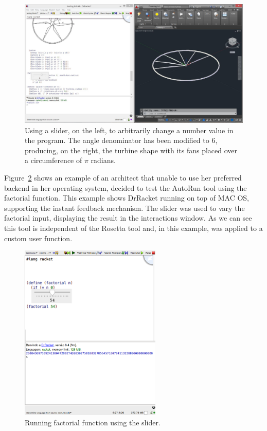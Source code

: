 \begin{figure}[!h]
  \centering
  \includegraphics[width=1\textwidth]{images/slider-turbine-2}
    \caption{Using a slider, on the left, to arbitrarily change a number value in the program. The angle denominator has been modified to 6, producing, on the right, the turbine shape with its fans placed over a circumference of $\pi$ radians.}
  \label{fig:sturbine2}
\end{figure}

Figure~\ref{fig:slidermac} shows an example of an architect that unable to use her preferred backend in her operating system, decided to test the AutoRun tool using the factorial function. This example shows DrRacket running on top of MAC OS, supporting the instant feedback mechanism. The slider was used to vary the factorial input, displaying the result in the interactions window. As we can see this tool is independent of the Rosetta tool and, in this example, was applied to a custom user function.

\begin{figure}[!h]
  \centering
  \includegraphics[width=0.6\textwidth]{images/slider-mac}
    \caption{Running factorial function using the slider.}
  \label{fig:slidermac}
\end{figure}


